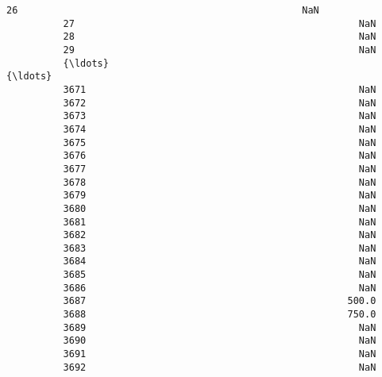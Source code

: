 \documentclass[11pt]{article}
\begin{document}
\begin{Verbatim}[commandchars=\\\{\}]
          26                                                  NaN                               
          27                                                  NaN                               
          28                                                  NaN                               
          29                                                  NaN                               
          {\ldots}                                                 {\ldots}                               
          3671                                                NaN                               
          3672                                                NaN                               
          3673                                                NaN                               
          3674                                                NaN                               
          3675                                                NaN                               
          3676                                                NaN                               
          3677                                                NaN                               
          3678                                                NaN                               
          3679                                                NaN                               
          3680                                                NaN                               
          3681                                                NaN                               
          3682                                                NaN                               
          3683                                                NaN                               
          3684                                                NaN                               
          3685                                                NaN                               
          3686                                                NaN                               
          3687                                              500.0                               
          3688                                              750.0                               
          3689                                                NaN                               
          3690                                                NaN                               
          3691                                                NaN                               
          3692                                                NaN                               

\end{Verbatim}
\end{document}
